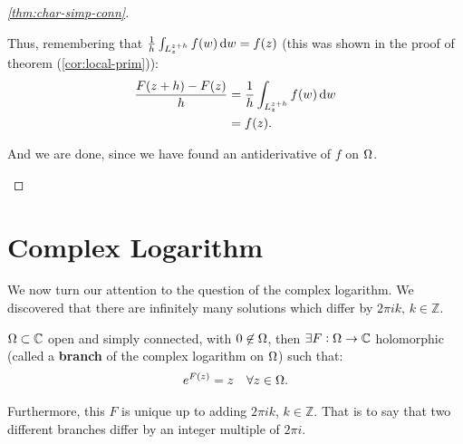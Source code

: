 \begin{proof}[\ref{thm:char-simp-conn}]
\begin{enumerate}
\begin{center}
\end{center}
    
    
    
    Thus, remembering that $\frac{1}{h} \int_{L_z^{z+h}} f(w) \dif w = f(z)$ (this was shown in the proof of theorem (\ref{cor:local-prim})):
    \begin{align*}
        \frac{F(z+h) - F(z)}{h} &= \frac{1}{h} \int_{L_z^{z+h}} f(w) \dif w\\
        &= f(z).
    \end{align*}
    
    And we are done, since we have found an antiderivative of $f$ on $\Omega$.
    
    
    
    
    
\end{enumerate}    

\end{proof}



\section{Complex Logarithm}

We now turn our attention to the question of the complex logarithm. We discovered that there are infinitely many solutions which differ by $2 \pi i k, \, k \in \mathbb{Z}$.

\begin{theorem}\label{thm:complex-log}
$\Omega \subset \mathbb{C}$ open and simply connected, with $0 \not\in \Omega$, then $\exists F : \Omega \to \mathbb{C}$ holomorphic (called a \textbf{branch} of the complex logarithm on $\Omega$) such that:
\begin{align*}
    e^{F(z)} &= z  &\forall z \in \Omega.
\end{align*}

Furthermore, this $F$ is unique up to adding $2 \pi i k, \, k \in \mathbb{Z}$. That is to say that two different branches differ by an integer multiple of $2 \pi i$.
\end{theorem}

